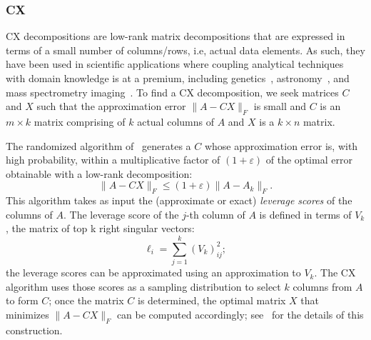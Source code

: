 \subsubsection{CX}
CX decompositions are
low-rank matrix decompositions that are expressed in terms of a small number of columns/rows, i.e, actual data elements.  As such, they have been used in scientific applications where coupling analytical techniques with domain knowledge is at a premium, including
genetics~\cite{Paschou07b}, astronomy~\cite{Yip14-AJ}, and mass spectrometry imaging~\cite{YRPMB15}. To find a CX decomposition, we seek matrices $C$ and $X$ such that the approximation error $\|A-CX\|_F$ is small and $C$ is an $m\times k$ matrix comprising of $k$
actual columns of $A$ and $X$ is a $k \times n$ matrix.


The randomized algorithm of~\cite{DMM08} generates a $C$ whose approximation error is, with high probability, within a multiplicative factor of $(1+\varepsilon)$ of the optimal error obtainable with a low-rank decomposition:
\[
\|A - CX\|_F \leq (1+ \varepsilon) \|A - A_k\|_F.
\]
This algorithm takes as input the (approximate or exact) \emph{leverage scores} of the columns of $A.$ The leverage score of the $j$-th column of $A$ is defined in terms of $V_k$, the matrix of top k right singular vectors:
  \begin{equation}
    \label{eqn:lev}
     \ell_i = \sum_{j=1}^k (V_k) _{ij}^2;
   \end{equation}
the leverage scores can be approximated using an approximation to $V_k.$ The CX algorithm uses those scores as a sampling distribution to select $k$ columns from $A$ to form $C$; once the matrix $C$ is determined, the optimal matrix $X$ that minimizes $\|A-CX\|_F$ can be computed accordingly; see~\cite{DMM08} for the details of this construction.

